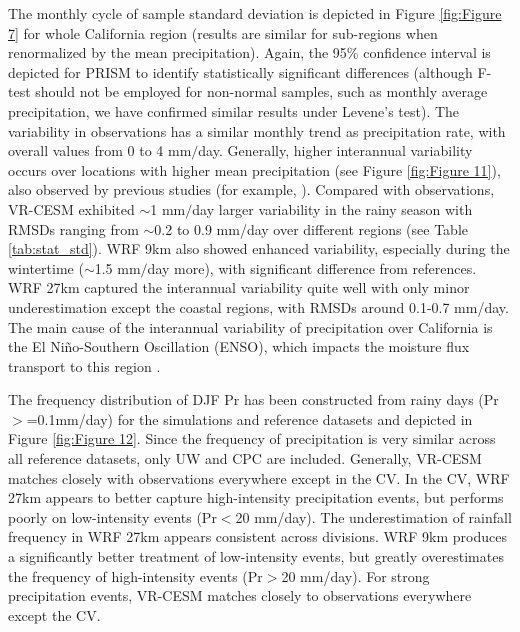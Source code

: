 \documentclass[ms]{agutex}   %
\begin{document}
\begin{article}
The monthly cycle of sample standard deviation is depicted in Figure \ref{fig:Figure 7} for whole California region (results are similar for sub-regions when renormalized by the mean precipitation).  Again, the 95\% confidence interval is depicted for PRISM to identify statistically significant differences (although F-test should not be employed for non-normal samples, such as monthly average precipitation, we have confirmed similar results under Levene's test). The variability in observations has a similar monthly trend as precipitation rate, with overall values from 0 to 4 mm$/$day.  Generally, higher interannual variability occurs over locations with higher mean precipitation (see Figure \ref{fig:Figure 11}), also observed by previous studies (for example, \cite{duffy2006simulations}). Compared with observations, VR-CESM exhibited $\sim$1 mm$/$day larger variability in the rainy season with RMSDs ranging from $\sim$0.2 to 0.9 mm/day over different regions (see Table \ref{tab:stat_std}). WRF 9km also showed enhanced variability, especially during the wintertime ($\sim$1.5 mm$/$day more), with significant difference from references. WRF 27km captured the interannual variability quite well with only minor underestimation except the coastal regions, with RMSDs around 0.1-0.7 mm/day. The main cause of the interannual variability of precipitation over California is the El Ni\~{n}o-Southern Oscillation (ENSO), which impacts the moisture flux transport to this region \citep{cayan1998decadal, cayan1999enso, leung2003hydroclimate2}.


The frequency distribution of DJF Pr has been constructed from rainy days (Pr$>$=0.1mm/day) for the simulations and reference datasets and depicted in Figure \ref{fig:Figure 12}.  Since the frequency of precipitation is very similar across all reference datasets, only UW and CPC are included. Generally, VR-CESM matches closely with observations everywhere except in the CV. In the CV, WRF 27km appears to better capture high-intensity precipitation events, but performs poorly on low-intensity events (Pr$<$20 mm/day). The underestimation of rainfall frequency in WRF 27km appears consistent across divisions. WRF 9km produces a significantly better treatment of low-intensity events, but greatly overestimates the frequency of high-intensity events (Pr$>$20 mm/day). For strong precipitation events, VR-CESM matches closely to observations everywhere except the CV.


\end{article}
\end{document}

